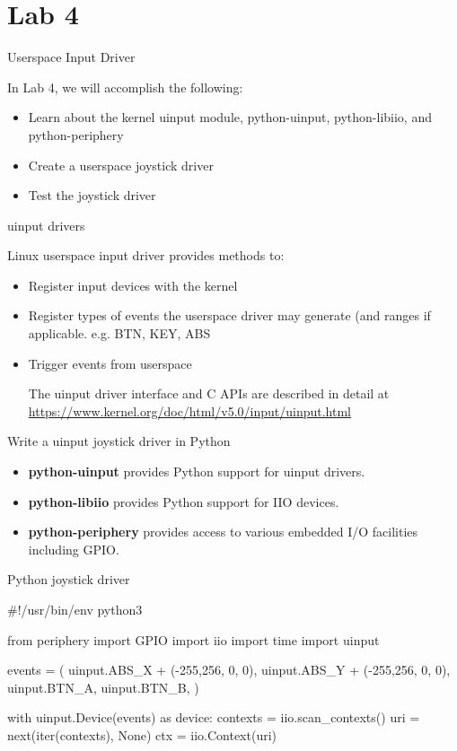\section{Lab 4}

\begin{frame}
   {Userspace Input Driver}

   In Lab 4, we will accomplish the following:
	\begin{itemize}
		\item
			Learn about the kernel uinput module, python-uinput, python-libiio, and python-periphery
		\item
			Create a userspace joystick driver
		\item
			Test the joystick driver
	\end{itemize}
\end{frame}

\begin{frame}
    {uinput drivers}

	Linux userspace input driver provides methods to:
\begin{itemize}
	\item
		Register input devices with the kernel
	\item
		Register types of events the userspace driver may generate (and ranges if applicable. e.g. BTN, KEY, ABS
	\item
		Trigger events from userspace

	The uinput driver interface and C APIs are described in detail at \url{https://www.kernel.org/doc/html/v5.0/input/uinput.html}
\end{itemize}
\end{frame}

\begin{frame}
    {Write a uinput joystick driver in Python}

	\begin{itemize}
		\item
	\textbf{python-uinput} provides Python support for uinput drivers.
		\item
	\textbf{python-libiio} provides Python support for IIO devices.
		\item
	\textbf{python-periphery} provides access to various embedded I/O facilities including GPIO.
	\end{itemize}
\end{frame}

\begin{frame}
	{Python joystick driver}
	\begin{raw}
#!/usr/bin/env python3

from periphery import GPIO
import iio
import time
import uinput

events = (
    uinput.ABS_X + (-255,256, 0, 0),
    uinput.ABS_Y + (-255,256, 0, 0),
    uinput.BTN_A,
    uinput.BTN_B,
    )

with uinput.Device(events) as device:
    contexts = iio.scan_contexts()
    uri = next(iter(contexts), None)
    ctx = iio.Context(uri)
	\end{raw}
\end{frame}

